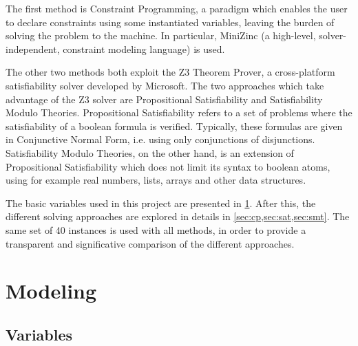 \documentclass[a4paper, 12pt]{article}
\begin{document}
The first method is Constraint Programming, a paradigm which enables the user to declare constraints using some instantiated variables, leaving the burden of solving the problem to the machine. In particular, MiniZinc (a high-level, solver-independent, constraint modeling language) is used.

The other two methods both exploit the Z3 Theorem Prover, a cross-platform satisfiability solver developed by Microsoft. The two approaches which take advantage of the Z3 solver are Propositional Satisfiability and Satisfiability Modulo Theories. Propositional Satisfiability refers to a set of problems where the satisfiability of a boolean formula is verified. Typically, these formulas are given in Conjunctive Normal Form, i.e. using only conjunctions of disjunctions. Satisfiability Modulo Theories, on the other hand, is an extension of Propositional Satisfiability which does not limit its syntax to boolean atoms, using for example real numbers, lists, arrays and other data structures.

The basic variables used in this project are presented in \cref{sec:modeling}. After this, the different solving approaches are explored in details in \cref{sec:cp,sec:sat,sec:smt}. The same set of 40 instances is used with all methods, in order to provide a transparent and significative comparison of the different approaches.


\clearpage


\section{Modeling}\label{sec:modeling}


\subsection{Variables}
\end{document}

